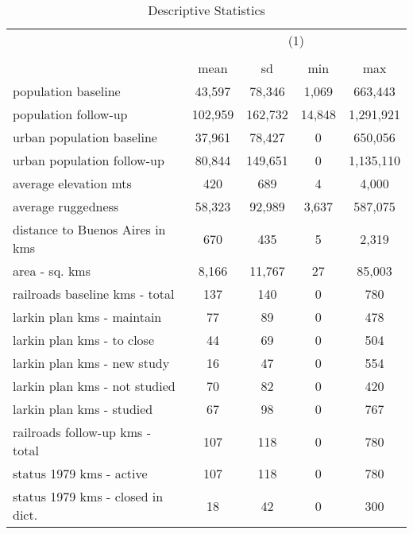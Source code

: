 \begin{table}[htbp]\centering
\def\sym#1{\ifmmode^{#1}\else\(^{#1}\)\fi}
\caption{Descriptive Statistics}
\begin{tabular}{l*{1}{cccc}}
\hline\hline
                    &\multicolumn{4}{c}{(1)}                            \\
                    &\multicolumn{4}{c}{}                               \\
                    &        mean&          sd&         min&         max\\
\hline
population baseline &      43,597&      78,346&       1,069&     663,443\\
population follow-up&     102,959&     162,732&      14,848&   1,291,921\\
urban population baseline&      37,961&      78,427&           0&     650,056\\
urban population follow-up&      80,844&     149,651&           0&   1,135,110\\
average elevation mts&         420&         689&           4&       4,000\\
average ruggedness  &      58,323&      92,989&       3,637&     587,075\\
distance to Buenos Aires in kms&         670&         435&           5&       2,319\\
area - sq. kms      &       8,166&      11,767&          27&      85,003\\
railroads baseline kms - total&         137&         140&           0&         780\\
larkin plan kms - maintain&          77&          89&           0&         478\\
larkin plan kms - to close&          44&          69&           0&         504\\
larkin plan kms - new study&          16&          47&           0&         554\\
larkin plan kms - not studied&          70&          82&           0&         420\\
larkin plan kms - studied&          67&          98&           0&         767\\
railroads follow-up kms - total&         107&         118&           0&         780\\
status 1979 kms - active&         107&         118&           0&         780\\
status 1979 kms - closed in dict.&          18&          42&           0&         300\\

\end{tabular}
\end{table}
